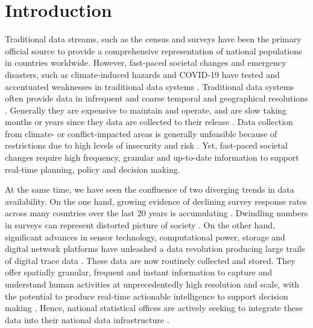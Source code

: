 \documentclass[]{rsos}%
\begin{document}
\providecommand{\EndFirstPage}{%
}

\maketitle

\newpage

\section{Introduction}\label{introduction}

Traditional data streams, such as the census and surveys have been the
primary official source to provide a comprehensive representation of
national populations in countries worldwide. However, fast-paced
societal changes and emergency disasters, such as climate-induced
hazards and COVID-19 have tested and accentuated weaknesses in
traditional data systems \citep{green2021}. Traditional data systems often
provide data in infrequent and coarse temporal and geographical
resolutions \citep{rowe23-bigdata}. Generally they are expensive to maintain
and operate, and are slow taking months or years since they data are
collected to their release \citep{rowe23-bigdata}. Data collection from
climate- or conflict-impacted areas is generally unfeasible because of
restrictions due to high levels of insecurity and risk
\citep{iradukunda2025}. Yet, fast-paced societal changes require high
frequency, granular and up-to-date information to support real-time
planning, policy and decision making.

At the same time, we have seen the confluence of two diverging trends in
data availability. On the one hand, growing evidence of declining survey
response rates across many countries over the last 20 years is
accumulating \citep{de2002trends, stedman2019, luiten2020}. Dwindling
numbers in surveys can represent distorted picture of society
\citep{luiten2020}. On the other hand, significant advances in sensor
technology, computational power, storage and digital network platforms
have unleashed a data revolution producing large trails of digital trace
data \citep{kitchin2014data}. These data are now routinely collected and
stored. They offer spatially granular, frequent and instant information
to capture and understand human activities at unprecedentedly high
resolution and scale, with the potential to produce real-time actionable
intelligence to support decision making \citep{rowe23-bigdata}. Hence,
national statistical offices are actively seeking to integrate these
data into their national data infrastructure \citep{unstatsMobilePhone2025, sdruk2025}.
\end{document}
